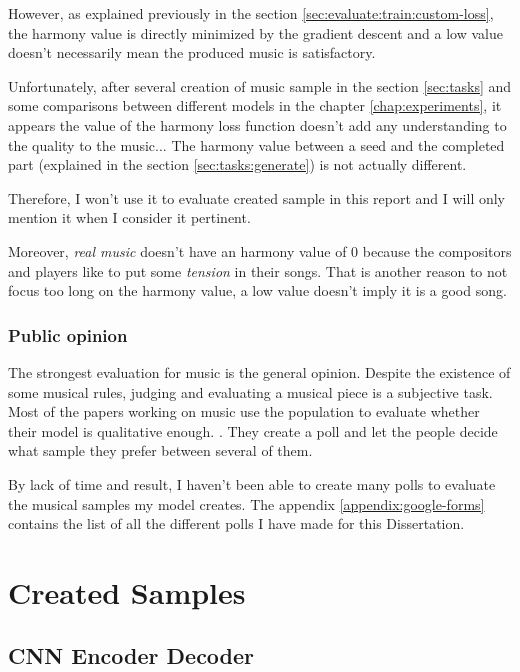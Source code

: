 \documentclass[12pt]{report}
\begin{document}
However, as explained previously in the section \ref{sec:evaluate:train:custom-loss}, the harmony value is directly minimized by the gradient descent and a low value doesn't necessarily mean the produced music is satisfactory.

Unfortunately, after several creation of music sample in the section \ref{sec:tasks} and some comparisons between different models in the chapter \ref{chap:experiments}, it appears the value of the harmony loss function doesn't add any understanding to the quality to the music...
The harmony value between a seed and the completed part (explained in the section \ref{sec:tasks:generate}) is not actually different.

Therefore, I won't use it to evaluate created sample in this report and I will only mention it when I consider it pertinent.

Moreover, \textit{real music} doesn't have an harmony value of $0$ because the compositors and players like to put some \textit{tension} in their songs.
That is another reason to not focus too long on the harmony value, a low value doesn't imply it is a good song.

\subsubsection{Public opinion}
\label{sec:eval:creation:public}

The strongest evaluation for music is the general opinion.
Despite the existence of some musical rules, judging and evaluating a musical piece is a subjective task.
Most of the papers working on music use the population to evaluate whether their model is qualitative enough. \cite{huang_counterpoint_2017, hadjeres_deepbach:_2016, huang_music_2018, liang_automatic_2017, huang_bach_2019}.
They create a poll and let the people decide what sample they prefer between several of them.

By lack of time and result, I haven't been able to create many polls to evaluate the musical samples my model creates.
The appendix \ref{appendix:google-forms} contains the list of all the different polls I have made for this Dissertation.

\section{Created Samples}
\label{sec:results:samples}

\subsection{CNN Encoder Decoder}
\end{document}
